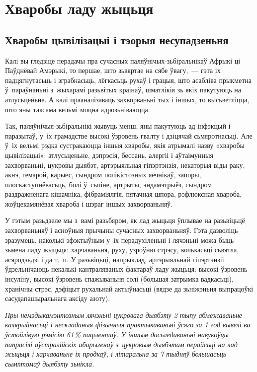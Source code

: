 \chapter{Хваробы ладу жыцьця}

\section{Хваробы цывілізацыі і тэорыя несупадзеньня}

Калі вы гледзіце перадачы пра сучасных паляўнічых-зьбіральнікаў Афрыкі ці Паўднёвай Амэрыкі, то першае, што зьвяртае на сябе ўвагу,~--- гэта іх падцягнутасьць і зграбнасьць, лёгкасьць рухаў і грацыя, што асабліва прыкметна ў~параўнаньні з~жыхарамі разьвітых краінаў, шматлікія зь якіх пакутуюць на атлусьценьне. А калі прааналізаваць захворваньні тых і іншых, то высьветліцца, што яны таксама вельмі моцна адрозьніваюцца.

Так, паляўнічыя-зьбіральнікі жывуць менш, яны пакутуюць ад інфэкцый і паразытаў, у~іх грамадстве высокі ўзровень гвалту і дзіцячай сьмяротнасьці. Але ў~іх вельмі рэдка сустракаюцца іншыя хваробы, якія атрымалі назву «хваробы цывілізацыі»: атлусьценьне, дэпрэсія, бессань, алергіі і аўтаімунныя захворваньні, цукровы дыябэт, артэрыяльная гіпэртэнзія, некаторыя віды раку, акнэ, гемарой, карыес, сындром полікістозных яечнікаў, запоры, плоскаступнёвасьць, болі ў~сьпіне, артрыты, эндамэтрыёз, сындром раздражнёнага кішачніка, фібраміялгія, пятачная шпора, рэфлюксная хвароба, жоўцекамянёвая хвароба і шэраг іншых захворваньняў.

У гэтым разьдзеле мы з~вамі разьбяром, як лад жыцьця ўплывае на разьвіцьцё захворваньняў і асноўныя прычыны сучасных захворваньняў. Гэта дазволіць зразумець, наколькі эфэктыўным у~іх перадухіленьні і лячэньні можа быць зьмена ладу жыцьця: харчаваньня, руху, узроўню стрэсу, колькасьці сьвятла, асяродзьдзі і да т.~п. У разьвіцьці, напрыклад, артэрыяльнай гіпэртэнзіі ўдзельнічаюць некалькі кантраляваных фактараў ладу жыцьця: высокі ўзровень інсуліну, высокі ўзровень спажываньня солі (большая затрымка вадкасьці), хранічны стрэс, дэфіцыт рухальнай актыўнасьці (вядзе да зьніжэньня выпрацоўкі сасудапашыральнага аксіду азоту).

\emph{Пры немэдыкамэнтозным лячэньні цукровага дыябэту 2 тыпу абмежаваньне калярыйнасьці і нескладаныя фізычныя практыкаваньні ўсяго за 1 год вывелі ва ўстойлівую рэмісію 61\,\% пацыентаў. У іншым дасьледаваньні навукоўцы папрасілі аўстралійскіх абарыгенаў з~цукровым дыябэтам перайсьці на лад жыцьця і харчаваньне іх продкаў, і літаральна за 7 тыдняў большасьць сымптомаў дыябэту зьнікла.}

